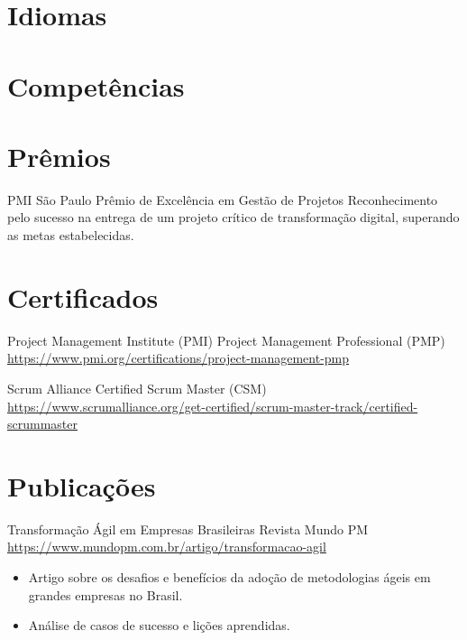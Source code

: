 \documentclass[a4paper, serif, 10pt]{moderncv}
\begin{document}
\section{Idiomas}

\section{Competências}

\section{Prêmios}

        {PMI São Paulo}
        {Prêmio de Excelência em Gestão de Projetos}
        {}
        {}
        {Reconhecimento pelo sucesso na entrega de um projeto crítico de transformação digital, superando as metas estabelecidas.}
\section{Certificados}

        {Project Management Institute (PMI)}
        {Project Management Professional (PMP)}
        {\url{https://www.pmi.org/certifications/project-management-pmp}}
        {}
        {}

        {Scrum Alliance}
        {Certified Scrum Master (CSM)}
        {\url{https://www.scrumalliance.org/get-certified/scrum-master-track/certified-scrummaster}}
        {}
        {}
\section{Publicações}

        {Transformação Ágil em Empresas Brasileiras}
        {Revista Mundo PM}
        {\url{https://www.mundopm.com.br/artigo/transformacao-agil}}
        {}
        {\begin{itemize}
\item Artigo sobre os desafios e benefícios da adoção de metodologias ágeis em grandes empresas no Brasil.
\item Análise de casos de sucesso e lições aprendidas.
\end{itemize}}
\end{document}
